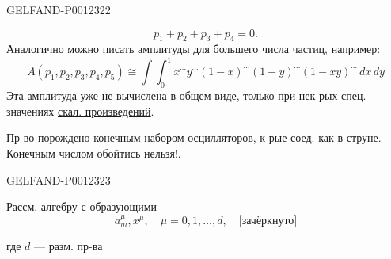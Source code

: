 \begin{GelfandAdjacentEvidence}{GELFAND-P001232}{2}

\begin{equation*}
p_1+p_2+p_3+p_4=0.
\end{equation*}
Аналогично можно писать амплитуды для большего числа частиц,
например:
\begin{equation*}
A(p_1,p_2,p_3,p_4,p_5)\cong\int\int_0^1
x^{\cdots}y^{\cdots}(1-x)^{\cdots}(1-y)^{\cdots}(1-xy)^{\cdots}\,dx\,dy\tag{12}
\end{equation*}
Эта амплитуда уже не вычислена в общем виде, только при нек-рых спец. значениях \underline{скал. произведений}.

Пр-во порождено конечным набором осцилляторов, к-рые соед. как в струне. Конечным числом обойтись нельзя!.
\end{GelfandAdjacentEvidence}
\begin{GelfandAdjacentEvidence}{GELFAND-P001232}{3}


Рассм. алгебру с образующими
\begin{equation*}
a_m^\mu,x^\mu,\quad \mu=0,1,\ldots,d,\quad
\text{[зачёркнуто]}\tag{13}
\end{equation*}
\end{GelfandAdjacentEvidence}

где \(d\) --- разм. пр-ва


